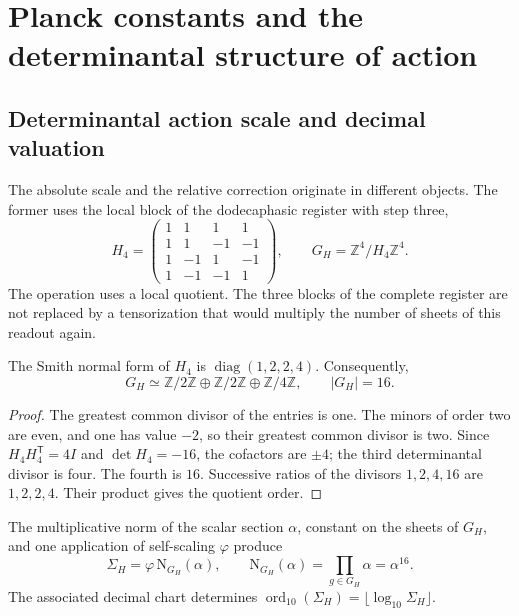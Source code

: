 \section{Planck constants and the determinantal structure of action}
\label{sec:action}
\subsection{Determinantal action scale and decimal valuation}

The absolute scale and the relative correction originate in different
objects. The former uses the local block of the dodecaphasic register
with step three,
\begin{equation}
 H_4=\begin{pmatrix}
 1&1&1&1\\1&1&-1&-1\\1&-1&1&-1\\1&-1&-1&1
 \end{pmatrix},\qquad
 G_H=\mathbb Z^4/H_4\mathbb Z^4.
 \label{eq:el-h4}
\end{equation}
The operation uses a local quotient. The three blocks of the complete
register are not replaced by a tensorization that would multiply
the number of sheets of this readout again.

\begin{lemma}
The Smith normal form of \(H_4\) is
\(\operatorname{diag}(1,2,2,4)\). Consequently,
\[
 G_H\simeq\mathbb Z/2\mathbb Z\oplus\mathbb Z/2\mathbb Z
 \oplus\mathbb Z/4\mathbb Z,\qquad |G_H|=16.
\]
\end{lemma}
\begin{proof}
The greatest common divisor of the entries is one. The minors of order two
are even, and one has value \(-2\), so their greatest common divisor
is two. Since \(H_4H_4^{\mathsf T}=4I\) and \(\det H_4=-16\), the
cofactors are \(\pm4\); the third determinantal divisor is four.
The fourth is \(16\). Successive ratios of the divisors
\(1,2,4,16\) are \(1,2,2,4\). Their product gives the quotient order.
\end{proof}

\begin{definition}
The multiplicative norm of the scalar section \(\alpha\), constant
on the sheets of \(G_H\), and one application of self-scaling
\(\varphi\) produce
\begin{equation}
 \Sigma_H=\varphi\,\mathrm N_{G_H}(\alpha),\qquad
 \mathrm N_{G_H}(\alpha)=\prod_{g\in G_H}\alpha=\alpha^{16}.
 \label{eq:el-lector-determinantal}
\end{equation}
The associated decimal chart determines
\(\operatorname{ord}_{10}(\Sigma_H)=\lfloor\log_{10}\Sigma_H\rfloor\).
\end{definition}

